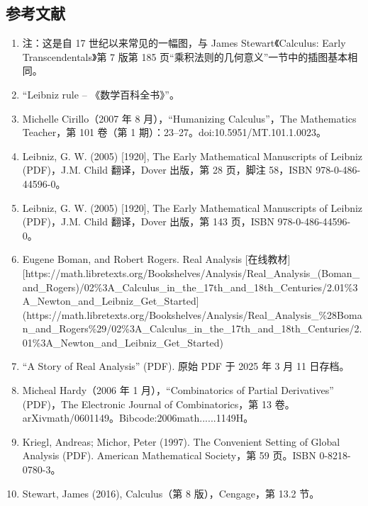 \subsection{参考文献}
\begin{enumerate}
\item 注：这是自 17 世纪以来常见的一幅图，与 James Stewart《Calculus: Early Transcendentals》第 7 版第 185 页“乘积法则的几何意义”一节中的插图基本相同。
\item “Leibniz rule – 《数学百科全书》”。
\item Michelle Cirillo（2007 年 8 月），“Humanizing Calculus”，The Mathematics Teacher，第 101 卷（第 1 期）：23–27。doi:10.5951/MT.101.1.0023。
\item Leibniz, G. W. (2005) [1920], The Early Mathematical Manuscripts of Leibniz (PDF)，J.M. Child 翻译，Dover 出版，第 28 页，脚注 58，ISBN 978-0-486-44596-0。
\item Leibniz, G. W. (2005) [1920], The Early Mathematical Manuscripts of Leibniz (PDF)，J.M. Child 翻译，Dover 出版，第 143 页，ISBN 978-0-486-44596-0。
\item Eugene Boman, and Robert Rogers. Real Analysis [在线教材] [https://math.libretexts.org/Bookshelves/Analysis/Real\_Analysis\_(Boman\_and\_Rogers)/02\%3A\_Calculus\_in\_the\_17th\_and\_18th\_Centuries/2.01\%3A\_Newton\_and\_Leibniz\_Get\_Started](https://math.libretexts.org/Bookshelves/Analysis/Real_Analysis_\%28Boman_and_Rogers\%29/02\%3A_Calculus_in_the_17th_and_18th_Centuries/2.01\%3A_Newton_and_Leibniz_Get_Started)
\item “A Story of Real Analysis” (PDF). 原始 PDF 于 2025 年 3 月 11 日存档。
\item Micheal Hardy（2006 年 1 月），“Combinatorics of Partial Derivatives” (PDF)，The Electronic Journal of Combinatorics，第 13 卷。arXiv\:math/0601149。Bibcode:2006math......1149H。
\item Kriegl, Andreas; Michor, Peter (1997). The Convenient Setting of Global Analysis (PDF). American Mathematical Society，第 59 页。ISBN 0-8218-0780-3。
\item Stewart, James (2016), Calculus（第 8 版），Cengage，第 13.2 节。
\end{enumerate}
